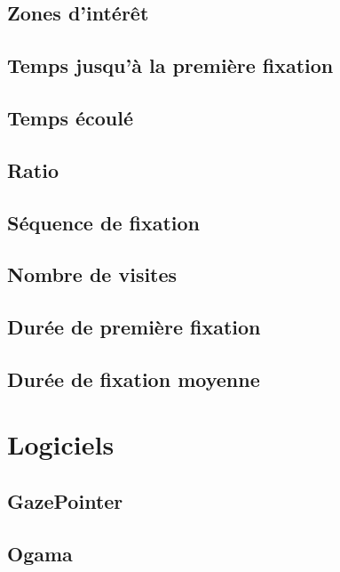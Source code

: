 \documentclass[12pt]{article}
\begin{document}
\subsection{Zones d'intérêt}

\subsection{Temps jusqu'à la première fixation}

\subsection{Temps écoulé}

\subsection{Ratio}

\subsection{Séquence de fixation}

\subsection{Nombre de visites}

\subsection{Durée de première fixation}

\subsection{Durée de fixation moyenne}


\section{Logiciels}

\subsection{GazePointer}

\subsection{Ogama}
\end{document}
